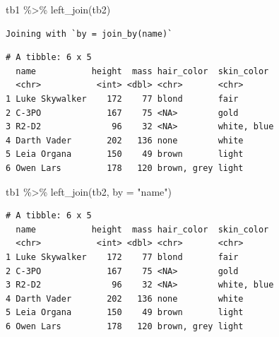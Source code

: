 \documentclass[
  letterpaper,
]{ctexbook}
\newenvironment{Shaded}{\begin{snugshade}}{\end{snugshade}}
\newcommand{\AttributeTok}[1]{\textcolor[rgb]{0.40,0.45,0.13}{#1}}
\newcommand{\FunctionTok}[1]{\textcolor[rgb]{0.28,0.35,0.67}{#1}}
\newcommand{\NormalTok}[1]{\textcolor[rgb]{0.00,0.23,0.31}{#1}}
\newcommand{\SpecialCharTok}[1]{\textcolor[rgb]{0.37,0.37,0.37}{#1}}
\newcommand{\StringTok}[1]{\textcolor[rgb]{0.13,0.47,0.30}{#1}}
\begin{document}
\begin{Shaded}
\begin{Highlighting}[]
\NormalTok{tb1 }\SpecialCharTok{\%\textgreater{}\%}
  \FunctionTok{left\_join}\NormalTok{(tb2)}
\end{Highlighting}
\end{Shaded}

\begin{verbatim}
Joining with `by = join_by(name)`
\end{verbatim}

\begin{verbatim}
# A tibble: 6 x 5
  name           height  mass hair_color  skin_color 
  <chr>           <int> <dbl> <chr>       <chr>      
1 Luke Skywalker    172    77 blond       fair       
2 C-3PO             167    75 <NA>        gold       
3 R2-D2              96    32 <NA>        white, blue
4 Darth Vader       202   136 none        white      
5 Leia Organa       150    49 brown       light      
6 Owen Lars         178   120 brown, grey light      
\end{verbatim}

\begin{Shaded}
\begin{Highlighting}[]
\NormalTok{tb1 }\SpecialCharTok{\%\textgreater{}\%}
  \FunctionTok{left\_join}\NormalTok{(tb2, }\AttributeTok{by =} \StringTok{"name"}\NormalTok{)}
\end{Highlighting}
\end{Shaded}

\begin{verbatim}
# A tibble: 6 x 5
  name           height  mass hair_color  skin_color 
  <chr>           <int> <dbl> <chr>       <chr>      
1 Luke Skywalker    172    77 blond       fair       
2 C-3PO             167    75 <NA>        gold       
3 R2-D2              96    32 <NA>        white, blue
4 Darth Vader       202   136 none        white      
5 Leia Organa       150    49 brown       light      
6 Owen Lars         178   120 brown, grey light      
\end{verbatim}


\backmatter
\end{document}
